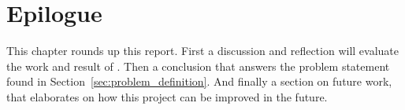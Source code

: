 \chapter{Epilogue}
This chapter rounds up this report. 
First a discussion and reflection will evaluate the work and result of \projectname{}.
Then a conclusion that answers the problem statement found in Section~\ref{sec:problem_definition}. 
And finally a section on future work, that elaborates on how this project can be improved in the future. 




